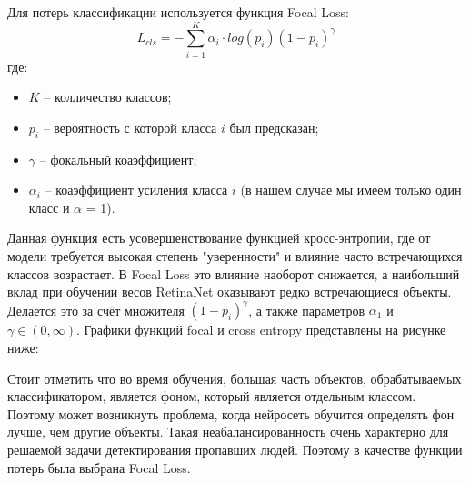 Для потерь классификации используется функция Focal Loss:
$$
L_{cls} = -\sum_{i=1}^K \alpha_i \cdot log(p_i)(1-p_i)^\gamma
$$
где:
\begin{itemize}
    \item $K$ -- колличество классов;
    \item $p_i$ -- вероятность с которой класса $i$ был предсказан;
    \item $\gamma$ -- фокальный коаэффициент;
    \item $\alpha_i$ -- коаэффициент усиления класса $i$ (в нашем случае мы имеем только один класс и $\alpha$ = 1).
\end{itemize}

Данная функция есть усовершенствование функцией кросс-энтропии, где от модели требуется высокая степень "уверенности" и влияние часто встречающихся классов возрастает. В Focal Loss это влияние наоборот снижается, а наибольший вклад при обучении весов RetinaNet оказывают редко встречающиеся объекты. Делается это за счёт множителя $(1-p_i)^\gamma$, а также параметров $\alpha_1$ и $\gamma \in(0, \infty)$. Графики функций focal и cross entropy представлены на рисунке ниже:


Стоит отметить что во время обучения, большая часть объектов, обрабатываемых классификатором, является фоном, который является отдельным классом. Поэтому может возникнуть проблема, когда нейросеть обучится определять фон лучше, чем другие объекты. Такая неабалансированность очень характерно для решаемой задачи детектирования пропавших людей. Поэтому в качестве функции потерь была выбрана Focal Loss.